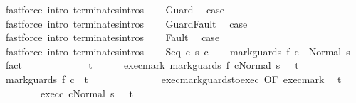 \begin{isabellebody}
\ {\isacharparenleft}fastforce\ intro{\isacharcolon}\ terminates{\isachardot}intros{\isacharparenright}\isanewline
{}\isamarkupfalse%
\isanewline
\ \ \isamarkupfalse%
\ Guard\ \isamarkupfalse%
\ {\isacharquery}case\ \isamarkupfalse%
\ {\isacharparenleft}fastforce\ intro{\isacharcolon}\ terminates{\isachardot}intros{\isacharparenright}\isanewline
{}\isamarkupfalse%
\isanewline
\ \ \isamarkupfalse%
\ GuardFault\ \isamarkupfalse%
\ {\isacharquery}case\ \isamarkupfalse%
\ {\isacharparenleft}fastforce\ intro{\isacharcolon}\ terminates{\isachardot}intros{\isacharparenright}\isanewline
{}\isamarkupfalse%
\isanewline
\ \ \isamarkupfalse%
\ Fault\ \isamarkupfalse%
\ {\isacharquery}case\ \isamarkupfalse%
\ {\isacharparenleft}fastforce\ intro{\isacharcolon}\ terminates{\isachardot}intros{\isacharparenright}\isanewline
{}\isamarkupfalse%
\isanewline
\ \ \isamarkupfalse%
\ {\isacharparenleft}Seq\ c{}\ s\ c{}{\isacharparenright}\isanewline
\ \ \isamarkupfalse%
\ {\isachardoublequoteopen}{\isasymGamma}{\isasymturnstile}mark{\isacharunderscore}guards\ f\ c{}\ {\isasymdown}\ Normal\ s{\isachardoublequoteclose}\ \isamarkupfalse%
\ fact\isanewline
\ \ \isamarkupfalse%
\ \isanewline
\ \ \isacommand{{\isacharbraceleft}}\isamarkupfalse%
\isanewline
\ \ \ \ \isamarkupfalse%
\ t\isanewline
\ \ \ \ \isamarkupfalse%
\ exec{\isacharunderscore}mark{\isacharcolon}\ {\isachardoublequoteopen}{\isasymGamma}{\isasymturnstile}{\isasymlangle}mark{\isacharunderscore}guards\ f\ c{}{\isacharcomma}Normal\ s\ {\isasymrangle}\ {\isasymRightarrow}\ t{\isachardoublequoteclose}\isanewline
\ \ \ \ \isamarkupfalse%
\ {\isachardoublequoteopen}{\isasymGamma}{\isasymturnstile}mark{\isacharunderscore}guards\ f\ c{}\ {\isasymdown}\ t{\isachardoublequoteclose}\isanewline
\ \ \ \ \isamarkupfalse%
\ {\isacharminus}\isanewline
\ \ \ \ \ \ \isamarkupfalse%
\ exec{\isacharunderscore}mark{\isacharunderscore}guards{\isacharunderscore}to{\isacharunderscore}exec\ {\isacharbrackleft}OF\ exec{\isacharunderscore}mark{\isacharbrackright}\ \isamarkupfalse%
\ t{\isacharprime}\ \isanewline
\ \ \ \ \ \ \ \ exec{\isacharunderscore}c{}{\isacharcolon}\ {\isachardoublequoteopen}{\isasymGamma}{\isasymturnstile}{\isasymlangle}c{}{\isacharcomma}Normal\ s\ {\isasymrangle}\ {\isasymRightarrow}\ t{\isacharprime}{\isachardoublequoteclose}\ \isanewline

\end{isabellebody}
